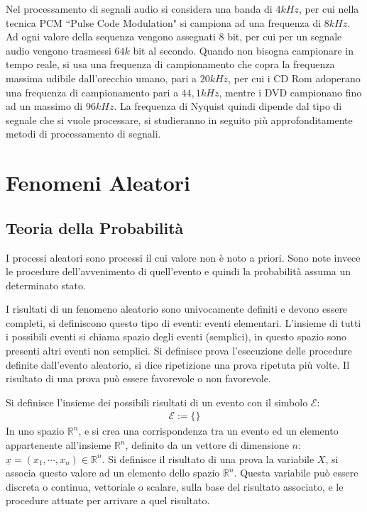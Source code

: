 \documentclass{article}
\numberwithin{equation}{subsection}
\begin{document}
Nel processamento di segnali audio si considera una banda di $4kHz$, per cui nella tecnica PCM ``Pulse Code Modulation" si campiona ad una frequenza di $8kHz$. 
Ad ogni valore della sequenza vengono assegnati $8$ bit, per cui per un segnale audio vengono trasmessi $64k$ bit al secondo. 
Quando non bisogna campionare in tempo reale, si usa una frequenza di campionamento che copra la frequenza massima udibile dall'orecchio umano, pari a $20kHz$, per cui 
i CD Rom adoperano una frequenza di campionamento pari a $44,1kHz$, mentre i DVD campionano fino ad un massimo di $96kHz$. La frequenza di Nyquist quindi dipende dal tipo 
di segnale che si vuole processare, si studieranno in seguito più approfonditamente metodi di processamento di segnali. 

\clearpage

\section{Fenomeni Aleatori}

\subsection{Teoria della Probabilità}


I processi aleatori sono processi il cui valore non è noto a priori. Sono note invece le procedure dell'avvenimento di quell'evento e quindi la probabilità assuma un 
determinato stato. 

I risultati di un fenomeno aleatorio sono univocamente definiti e devono essere completi, si definiscono questo tipo di eventi: eventi elementari. 
L'insieme di tutti i possibili eventi si chiama spazio degli eventi (semplici), in questo spazio sono presenti altri eventi non semplici. 
Si definisce prova l'esecuzione delle procedure definite dall'evento aleatorio, si dice ripetizione una prova ripetuta più volte. Il risultato di una prova può essere favorevole 
o non favorevole. 

Si definisce l'insieme dei possibili risultati di un evento con il simbolo $\mathscr{E}$:
\begin{gather}
    \mathscr{E}:=\{\}
\end{gather}
In uno spazio $\mathbb{R}^n$, e si crea una corrispondenza tra un evento ed un elemento appartenente all'insieme $\mathbb{R}^n$, 
definito da un vettore di dimensione $n$: $\underline{x}=(x_1,\cdots,x_n)\in\mathbb{R}^n$. 
Si definisce il risultato di una prova la variabile $X$, si associa questo valore ad un elemento dello spazio $\mathbb{R}^n$. Questa variabile può essere discreta o continua, 
vettoriale o scalare, sulla base del risultato associato, e le procedure attuate per arrivare a quel risultato. 
\end{document}
